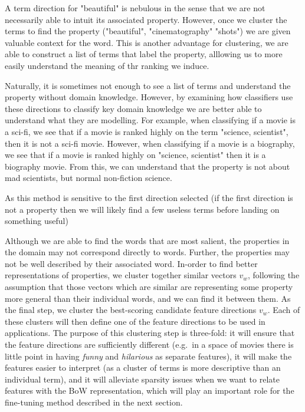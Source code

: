 A term direction for "beautiful" is nebulous in the sense that we are not necessarily able to intuit its associated property. However, once we cluster the terms to find the property ("beautiful", "cinematography" "shots") we are given valuable context for the word. This is another advantage for clustering, we are able to construct a list of terms that label the property, alllowing us to more easily understand the meaning of thr ranking we induce.

Naturally, it is sometimes not enough to see a list of terms and understand the property without domain knowledge. However, by examining how classifiers use these directions to classify key domain knowledge we are better able to understand what they are modelling. For example, when classifying if a movie is a sci-fi, we see that if a movie is ranked highly on the term "science, scientist", then it is not a sci-fi movie. However, when classifying if a movie is a biography, we see that if a movie is ranked highly on "science, scientist" then it is a biography movie. From this, we can understand that the property is not about mad scientists, but normal non-fiction science. 

As this method is sensitive to the first direction selected (if the first direction is not a property then we will likely find a few useless terms before landing on something useful) %

Although we are able to find the words that are most salient, the properties in the domain may not correspond directly to words. Further, the properties may not be well described by their associated word. In-order to find better representations of properties, we cluster together similar vectors $v_w$, following the assumption that those vectors which are similar are representing some property more general than their individual words, and we can find it between them.
As the final step, we cluster the best-scoring candidate feature directions $v_w$. Each of these clusters will then define one of the feature directions to be used in applications. The purpose of this clustering step is three-fold: it will ensure that the feature directions are sufficiently different (e.g.\ in a space of movies there is little point in having \emph{funny} and \emph{hilarious} as separate features), it will make the features easier to interpret (as a cluster of terms is more descriptive than an individual term), and it will alleviate sparsity issues when we want to relate features with the BoW representation, which will play an important role for the fine-tuning method described in the next section.


